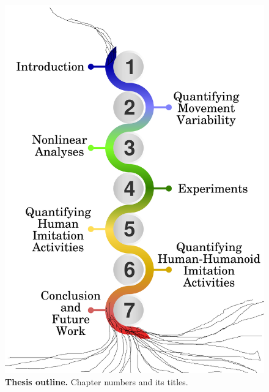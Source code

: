 \begin{figure}
\centering
\includegraphics[width=1.0\textwidth]{thesis-structure-v04}
    \caption{
	{\bf Thesis outline.}
	Chapter numbers and its titles.
	  }
    \label{fig:thesis-outline}
\end{figure}


